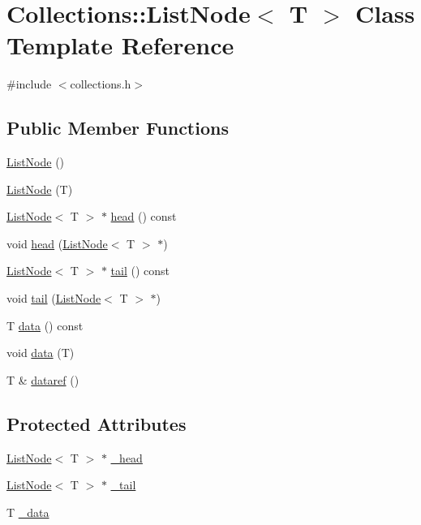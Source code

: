 \hypertarget{class_collections_1_1_list_node}{}\section{Collections\+:\+:List\+Node$<$ T $>$ Class Template Reference}
\label{class_collections_1_1_list_node}


{\ttfamily \#include $<$collections.\+h$>$}

\subsection*{Public Member Functions}
\begin{DoxyCompactItemize}
\item 
\hyperlink{class_collections_1_1_list_node_ad89dab0c61b95b43c587b0efce053194}{List\+Node} ()
\item 
\hyperlink{class_collections_1_1_list_node_acaabce83984a44c70640cb93d964b711}{List\+Node} (T)
\item 
\hyperlink{class_collections_1_1_list_node}{List\+Node}$<$ T $>$ $\ast$ \hyperlink{class_collections_1_1_list_node_a914e3ed4b565faa4cef38e9f7b28bfee}{head} () const
\item 
void \hyperlink{class_collections_1_1_list_node_af336d8b69f73ae5c40874572a688c48a}{head} (\hyperlink{class_collections_1_1_list_node}{List\+Node}$<$ T $>$ $\ast$)
\item 
\hyperlink{class_collections_1_1_list_node}{List\+Node}$<$ T $>$ $\ast$ \hyperlink{class_collections_1_1_list_node_a102a97a1589e2df0797a9717bbecd952}{tail} () const
\item 
void \hyperlink{class_collections_1_1_list_node_aa2a2e35182902b354508841661bf181c}{tail} (\hyperlink{class_collections_1_1_list_node}{List\+Node}$<$ T $>$ $\ast$)
\item 
T \hyperlink{class_collections_1_1_list_node_abec2647bdf4181dcb560e6e8eb4ffdf4}{data} () const
\item 
void \hyperlink{class_collections_1_1_list_node_a898a4374f1e33bf00f6a69fb3f816182}{data} (T)
\item 
T \& \hyperlink{class_collections_1_1_list_node_ad28943a3024eb910bbb9c031da6ca50d}{dataref} ()
\end{DoxyCompactItemize}
\subsection*{Protected Attributes}
\begin{DoxyCompactItemize}
\item 
\hyperlink{class_collections_1_1_list_node}{List\+Node}$<$ T $>$ $\ast$ \hyperlink{class_collections_1_1_list_node_ac40e75e29325a6767686d7e828fa3b6a}{\+\_\+head}
\item 
\hyperlink{class_collections_1_1_list_node}{List\+Node}$<$ T $>$ $\ast$ \hyperlink{class_collections_1_1_list_node_a292ac07a1175ba5feecc79c7982bbf61}{\+\_\+tail}
\item 
T \hyperlink{class_collections_1_1_list_node_a00e5880511d5045370127b2da895ab4f}{\+\_\+data}
\end{DoxyCompactItemize}


